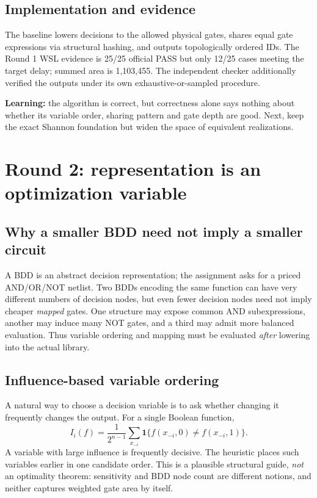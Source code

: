 \subsection{Implementation and evidence}
The baseline lowers decisions to the allowed physical gates, shares equal gate expressions via structural hashing, and outputs topologically ordered IDs. The Round 1 WSL evidence is 25/25 official PASS but only 12/25 cases meeting the target delay; summed area is 1,103,455. The independent checker additionally verified the outputs under its own exhaustive-or-sampled procedure.

\begin{tcolorbox}[colback=ResearchPeach!35,colframe=ResearchRose,title=Decision after Round 1]
\textbf{Learning:} the algorithm is correct, but correctness alone says nothing about whether its variable order, sharing pattern and gate depth are good. Next, keep the exact Shannon foundation but widen the space of equivalent realizations.
\end{tcolorbox}

\section{Round 2: representation is an optimization variable}
\subsection{Why a smaller BDD need not imply a smaller circuit}
A BDD is an abstract decision representation; the assignment asks for a priced AND/OR/NOT netlist. Two BDDs encoding the same function can have very different numbers of decision nodes, but even fewer decision nodes need not imply cheaper \emph{mapped} gates. One structure may expose common AND subexpressions, another may induce many NOT gates, and a third may admit more balanced evaluation. Thus variable ordering and mapping must be evaluated \emph{after} lowering into the actual library.

\subsection{Influence-based variable ordering}
A natural way to choose a decision variable is to ask whether changing it frequently changes the output. For a single Boolean function,
\begin{equation}
 I_i(f)=\frac{1}{2^{n-1}}\sum_{x_{-i}}\mathbf1\{f(x_{-i},0)\ne f(x_{-i},1)\}.
\end{equation}
A variable with large influence is frequently decisive. The heuristic places such variables earlier in one candidate order. This is a plausible structural guide, \emph{not} an optimality theorem: sensitivity and BDD node count are different notions, and neither captures weighted gate area by itself.

